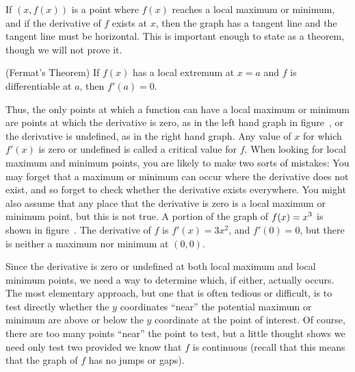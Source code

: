 If $(x,f(x))$ is a point where $f(x)$ reaches a local maximum or minimum,
and if the derivative of $f$ exists at $x$, then the graph has a
tangent line and the tangent line must be horizontal. This is
important enough to state as a theorem, though we will not prove it.

\begin{theorem} (Fermat's Theorem) If $f(x)$ has a local extremum at $x=a$ and
$f$ is differentiable at $a$, then $f'(a)=0$.
\end{theorem}

Thus, the only
points at which a function can have a local maximum or minimum are
points at which the derivative is zero, as in the left hand graph in
figure~,
or the derivative is undefined, as in the right hand graph. Any value
of $x$ for which $f'(x)$ is zero or undefined is called a
{\dfont critical
value\/} for $f$.
When looking for local maximum and minimum points, you are likely to
make two sorts of mistakes: You may forget that a maximum or minimum
can occur where the derivative does not exist, and so forget to check
whether the derivative exists everywhere. You might also assume that
any place that the derivative is zero is a local maximum or minimum
point, but this is not true. A portion of the graph of $\displaystyle f(x)=x^3$ is
shown in figure~. The derivative of $f$ is
$f'(x)=3x^2$, and $f'(0)=0$, but there is neither a maximum nor
minimum at $(0,0)$.


Since the derivative is zero or undefined at both local maximum and
local minimum points, we need a way to determine which, if either,
actually occurs. The most
elementary approach, but one that is often tedious or difficult, is to
test directly whether the $y$ coordinates ``near'' the potential
maximum or minimum are above or below the $y$ coordinate at the point
of interest. Of course, there are too many points ``near'' the point
to test, but a little thought shows we need only test two provided we
know that $f$ is continuous (recall that this means that the graph of
$f$ has no jumps or gaps).

